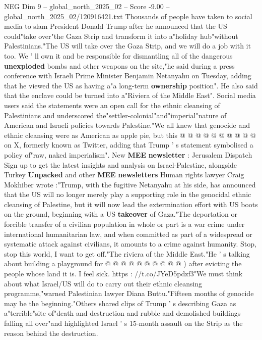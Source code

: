 \begin{textsample}{NEG Dim 9 – global\_north\_2025\_02 – Score -9.00 – global\_north\_2025\_02/120916421.txt}  \label{ex:f9_neg_002}
Thousands of people have taken to social media to slam President Donald Trump after he announced that the US could"take over"the Gaza Strip and transform it into a"holiday hub"without Palestinians."The US will take over the Gaza Strip, and we will do a job with it too.
We ' ll own it and be responsible for dismantling all of the dangerous \textbf{unexploded} bombs and other weapons on the site,"he said during a press conference with Israeli Prime Minister Benjamin Netanyahu on Tuesday, adding that he viewed the US as having a"a long-term \textbf{ownership} position".
He also said that the enclave could be turned into a"Riviera of the Middle East".
Social media users said the statements were an open call for the ethnic cleansing of Palestinians and underscored the"settler-colonial"and"imperial"nature of American and Israeli policies towards Palestine."We all knew that genocide and ethnic cleansing were as American as apple pie, but this @ @ @ @ @ @ @ @ @ @ on X, formerly known as Twitter, adding that Trump ' s statement symbolised a policy of"raw, naked imperialism".
New \textbf{MEE} \textbf{newsletter} : Jerusalem Dispatch Sign up to get the latest insights and analysis on Israel-Palestine, alongside Turkey \textbf{Unpacked} and other \textbf{MEE} \textbf{newsletters} Human rights lawyer Craig Mokhiber wrote :"Trump, with the fugitive Netanyahu at his side, has announced that the US will no longer merely play a supporting role in the genocidal ethnic cleansing of Palestine, but it will now lead the extermination effort with US boots on the ground, beginning with a US \textbf{takeover} of Gaza."The deportation or forcible transfer of a civilian population in whole or part is a war crime under international humanitarian law, and when committed as part of a widespread or systematic attack against civilians, it amounts to a crime against humanity.
Stop, stop this world, I want to get off."The riviera of the Middle East."He ' s talking about building a playground for @ @ @ @ @ @ @ @ @ @ ) after evicting the people whose land it is.
I feel sick. https : //t.co/JYeD5pdzf3"We must think about what Israel/US will do to carry out their ethnic cleansing programme,"warned Palestinian lawyer Diana Buttu."Fifteen months of genocide may be the beginning."Others shared clips of Trump ' s describing Gaza as a"terrible"site of"death and destruction and rubble and demolished buildings falling all over"and highlighted Israel ' s 15-month assault on the Strip as the reason behind the destruction.

\end{textsample}
